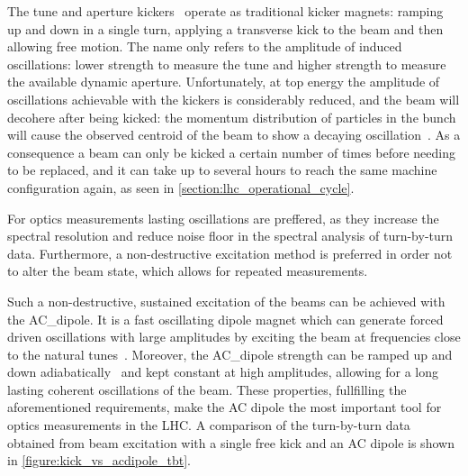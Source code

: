 The tune and aperture kickers~\cite{CERN:Barlow:Control_MKQA_LHC,IPMS:Carlier:Kicker_Pulse_Generator_Measurement_Tune_Dynamic_Aperture_LHC} operate as traditional kicker magnets: ramping up and down in a single turn, applying a transverse kick to the beam and then allowing free motion.
The name only refers to the amplitude of induced oscillations: lower strength to measure the tune and higher strength to measure the available dynamic aperture.
Unfortunately, at top energy the amplitude of oscillations achievable with the kickers is considerably reduced, and the beam will decohere after being kicked: the momentum distribution of particles in the bunch will cause the observed centroid of the beam to show a decaying oscillation~\cite{Report:Meller:Decoherence_Kicked_Beams}.
As a consequence a beam can only be kicked a certain number of times before needing to be replaced, and it can take up to several hours to reach the same machine configuration again, as seen in \cref{section:lhc_operational_cycle}.

For \gls{optics} measurements lasting oscillations are preffered, as they increase the spectral resolution and reduce noise floor in the spectral analysis of turn-by-turn data.
Furthermore, a non-destructive excitation method is preferred in order not to alter the beam state, which allows for repeated measurements.

Such a non-destructive, sustained excitation of the beams can be achieved with the \gls{AC_dipole}.
It is a fast oscillating dipole magnet which can generate forced driven oscillations with large amplitudes by exciting the beam at frequencies close to the natural tunes~\cite{PHD:Miyamoto,CERN:Serrano:LHC_ACDipole_Introduction}.
Moreover, the \gls{AC_dipole} strength can be ramped up and down adiabatically~\cite{PRAB:Tomas:Adiabaticity_Ramping_Process_AC_Dipole} and kept constant at high amplitudes, allowing for a long lasting coherent oscillations of the beam.
These properties, fullfilling the aforementioned requirements, make the AC dipole the most important tool for optics measurements in the LHC.
A comparison of the turn-by-turn data obtained from beam excitation with a single free kick and an AC dipole is shown in \cref{figure:kick_vs_acdipole_tbt}.

